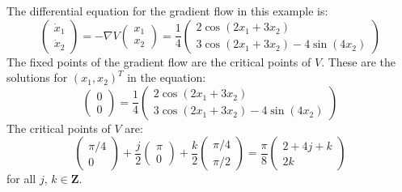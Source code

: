    The differential equation for the gradient flow in this example is:
\begin{equation*}
\begin{pmatrix}
\dot{x}_1 \\ \dot{x}_2 
\end{pmatrix}
=
-\nabla V
\begin{pmatrix}
x_1 \\ x_2 
\end{pmatrix}
=
\frac{1}{4} 
\begin{pmatrix}
2 \cos(2 x_1 + 3 x_2) \\ 3 \cos(2 x_1 + 3 x_2) - 4 \sin(4 x_2)
\end{pmatrix}
\end{equation*}
The fixed points of the gradient flow are the critical points of $V$.  These
are the solutions for $(x_1, x_2)^T$ in the equation:
\begin{equation*}
\begin{pmatrix}
0 \\ 0
\end{pmatrix}
=
\frac{1}{4} 
\begin{pmatrix}
2 \cos(2 x_1 + 3 x_2) \\ 3 \cos(2 x_1 + 3 x_2) - 4 \sin(4 x_2)
\end{pmatrix}
\end{equation*}
The critical points of $V$ are:
\begin{equation*}
\begin{pmatrix}
\pi/4 \\ 0
\end{pmatrix}
+ \frac{j}{2} 
\begin{pmatrix}
\pi \\ 0
\end{pmatrix}
+ \frac{k}{2}
\begin{pmatrix}
\pi/4 \\ \pi/2
\end{pmatrix}
=
\frac{\pi}{8}
\begin{pmatrix}
2+4j+k \\ 2k
\end{pmatrix}
\end{equation*}
for all $j$, $k \in \mathbf{Z}$.

